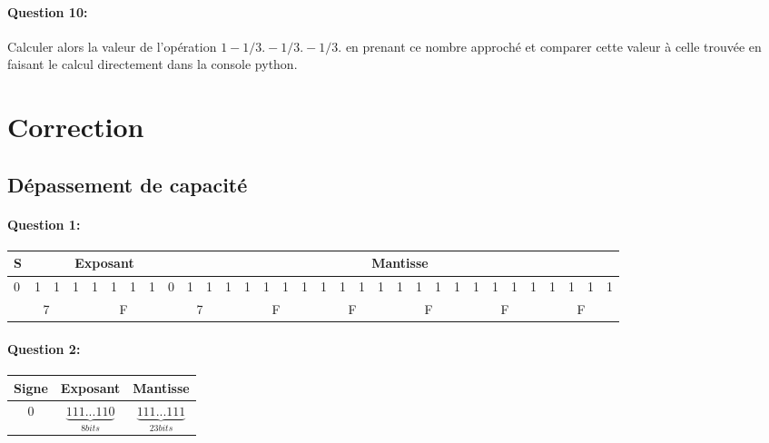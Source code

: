 \paragraph{Question 10:} Calculer alors la valeur de l'opération $1-1/3.-1/3.-1/3.$ en prenant ce nombre approché et comparer cette valeur à celle trouvée en faisant le calcul directement dans la console python.

\ifdef{\public}{}{}

\newpage

\pagestyle{correction}

\section{Correction}

\subsection{Dépassement de capacité}

\paragraph{Question 1:}

\setlength{\tabcolsep}{0.1cm}
\begin{center}
\begin{scriptsize}
\begin{tabular}{|*{32}{l|}}
\hline
S & \multicolumn{8}{c|}{Exposant} & \multicolumn{23}{c|}{Mantisse} \\
\hline
0 & 1 & 1 & 1 & 1 & 1 & 1 & 1 & 0 & 1 & 1 & 1 & 1 & 1 & 1 & 1 & 1 & 1 & 1 & 1 & 1 & 1 & 1 & 1 & 1 & 1 & 1 & 1 & 1 & 1 & 1 & 1 \\
\hline
\multicolumn{4}{|c|}{7} & \multicolumn{4}{c|}{F} & \multicolumn{4}{c|}{7} & \multicolumn{4}{c|}{F} & \multicolumn{4}{c|}{F} & \multicolumn{4}{c|}{F} & 
\multicolumn{4}{c|}{F} & \multicolumn{4}{c|}{F} \\
\hline
\end{tabular}
\end{scriptsize}
\end{center}

\paragraph{Question 2:}

\begin{center}
	\begin{tabular}{|c c c|}
	\hline
	Signe & Exposant & Mantisse \\
	\hline
	0 & $\underbrace{111...110}_{8 bits}$ & $\underbrace{111...111}_{23 bits}$ \\
	\hline
	\end{tabular}
\end{center}

